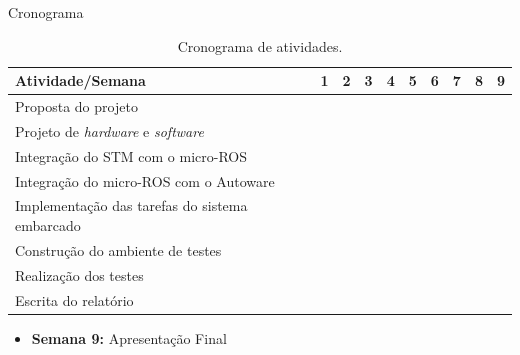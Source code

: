 \documentclass{if-beamer}
\begin{document}
\begin{frame}{Cronograma}
	
	
	\begin{table}
		\centering
		\small{
			\begin{tabular}{|b|b|b|b|b|b|b|b|b|b|}
				\hline
				\textbf{Atividade/Semana} & 1 \cellcolor{lightgray} & \textbf{2} \cellcolor{lightgray} & 3 \cellcolor{lightgray} & \textbf{4} \cellcolor{lightgray} & 5 \cellcolor{lightgray} & 6 \cellcolor{lightgray} & \textbf{7} \cellcolor{lightgray} & 8\cellcolor{lightgray} & \textbf{9} \cellcolor{lightgray}\\
				\hline
				Proposta do projeto  & \cellcolor{unifeiblue} &  &  &  &  &  &  &  &  \\
				\hline
				Projeto de \textit{hardware} e \textit{software}  &  & \cellcolor{unifeiblue} & \cellcolor{unifeiblue} &  &  &  &  &  &  \\
				\hline
				Integração do STM com o micro-ROS  &  & \cellcolor{unifeiblue} &  &  &  &  &  &  &  \\
				\hline
				Integração do micro-ROS com o Autoware  &  &  & \cellcolor{unifeiblue} & \cellcolor{unifeiblue} & \cellcolor{unifeiblue} &  &  &  &  \\
				\hline
				Implementação das tarefas do sistema embarcado  &  &  &  & \cellcolor{unifeiblue} & \cellcolor{unifeiblue} & \cellcolor{unifeiblue} & \cellcolor{unifeiblue} &  &  \\
				\hline
				Construção do ambiente de testes  &  &  &  &  & \cellcolor{unifeiblue} & \cellcolor{unifeiblue} & \cellcolor{unifeiblue} &  &  \\
				\hline
				Realização dos testes  &  &  &  &  &  &  & \cellcolor{unifeiblue} & \cellcolor{unifeiblue} & \cellcolor{unifeiblue} \\
				\hline
				Escrita do relatório  &   & \cellcolor{unifeiblue} & \cellcolor{unifeiblue} & \cellcolor{unifeiblue} & \cellcolor{unifeiblue} & \cellcolor{unifeiblue} & \cellcolor{unifeiblue} & \cellcolor{unifeiblue} & \cellcolor{unifeiblue} \\
				\hline
			\end{tabular}
		}
		\caption{Cronograma de atividades.}
		\label{tab:crono}
	\end{table}
	
	\begin{itemize}
		\small
		\item \textbf{Semana 9:} Apresentação Final
	\end{itemize}
	
\end{frame}
\end{document}
